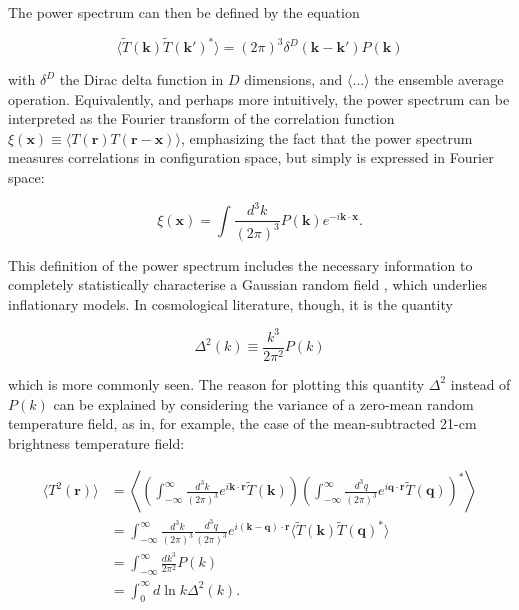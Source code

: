 \documentclass[floats,floatfix,showpacs,amssymb,prd,superscriptaddress,nofootinbib]{revtex4-2} %
\begin{document}
The power spectrum can then be defined by the equation

\begin{equation}
    \langle \tilde{T} (\textbf{k}) \tilde{T} (\textbf{k}') ^{*} \rangle = (2 \pi)^3 \delta^{D}  (\textbf{k} - \textbf{k}') P(\textbf{k})
\end{equation}

\noindent with $\delta^D$ the Dirac delta function in $D$ dimensions, and $\langle ... \rangle$ the ensemble average operation. Equivalently, and perhaps more intuitively, the power spectrum can be interpreted as the Fourier transform of the correlation function $\xi(\textbf{x}) \equiv \langle T(\textbf{r}) T(\textbf{r} - \textbf{x}) \rangle$, emphasizing the fact that the power spectrum measures correlations in configuration space, but simply is expressed in Fourier space:

\begin{equation}
    \xi(\textbf{x}) = \int \frac{d^3 k}{(2 \pi)^3} P(\textbf{k}) e^{-i \textbf{k} \cdot \textbf{x}}.
\end{equation}

This definition of the power spectrum includes the necessary information to completely statistically characterise a Gaussian random field \citep{Coles_2001}, which underlies inflationary models. In cosmological literature, though, it is the quantity 

\begin{equation}
    \Delta^2 (k) \equiv \frac{k^3}{2\pi^2} P(k)
\end{equation}

\noindent which is more commonly seen. The reason for plotting this quantity $\Delta^2$ instead of $P(k)$ can be explained by considering the variance of a zero-mean random temperature field, as in, for example, the case of the mean-subtracted 21-cm brightness temperature field:

\begin{equation}
\begin{split}
    \langle T^2 (\textbf{r}) \rangle
    & = \left\langle \left( \int^\infty _{-\infty} \frac{d^3 k}{(2\pi)^3} e^{i \textbf{k} \cdot \textbf{r}} \tilde{T} (\textbf{k}) \right) \left( \int^\infty _{-\infty} \frac{d^3 q}{(2\pi)^3} e^{i \textbf{q} \cdot \textbf{r}} \tilde{T} (\textbf{q}) \right)^{*} \right\rangle \\
    & = \int^\infty _{-\infty} \frac{d^3 k}{(2\pi)^3} \frac{d^3 q}{(2\pi)^3} e^{i (\textbf{k} - \textbf{q}) \cdot \textbf{r}} \langle \tilde{T} (\textbf{k}) \tilde{T} (\textbf{q})^{*} \rangle \\
    & = \int^\infty _{-\infty} \frac{dk^3}{2\pi^2} P(k) \\
    & = \int^\infty _{0} d \ln k \Delta^2 (k).
\end{split}
\end{equation}
\end{document}
